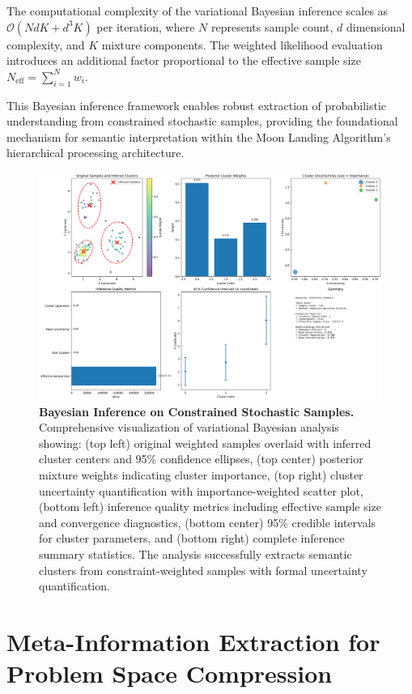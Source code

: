 \documentclass[11pt,a4paper]{article}
\begin{document}
The computational complexity of the variational Bayesian inference scales as $\mathcal{O}(NdK + d^3K)$ per iteration, where $N$ represents sample count, $d$ dimensional complexity, and $K$ mixture components. The weighted likelihood evaluation introduces an additional factor proportional to the effective sample size $N_{\text{eff}} = \sum_{i=1}^N w_i$.

This Bayesian inference framework enables robust extraction of probabilistic understanding from constrained stochastic samples, providing the foundational mechanism for semantic interpretation within the Moon Landing Algorithm's hierarchical processing architecture.

\begin{figure}[htbp]
\centering
\includegraphics[width=\textwidth]{images/bayesian_inference_demo.png}
\caption{\textbf{Bayesian Inference on Constrained Stochastic Samples.} Comprehensive visualization of variational Bayesian analysis showing: (top left) original weighted samples overlaid with inferred cluster centers and 95\% confidence ellipses, (top center) posterior mixture weights indicating cluster importance, (top right) cluster uncertainty quantification with importance-weighted scatter plot, (bottom left) inference quality metrics including effective sample size and convergence diagnostics, (bottom center) 95\% credible intervals for cluster parameters, and (bottom right) complete inference summary statistics. The analysis successfully extracts semantic clusters from constraint-weighted samples with formal uncertainty quantification.}
\label{fig:bayesian-inference}
\end{figure}

\section{Meta-Information Extraction for Problem Space Compression}
\label{sec:meta-information-extraction}
\end{document}
